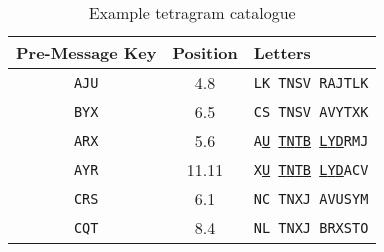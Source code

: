 \begin{table}[h!]
	\centering
	\begin{tabular}{|c|c|l|}
		\hline
		\textbf{Pre-Message Key} & \textbf{Position} & \textbf{Letters}                                                                                                                                                                                                                                        \\
		\hline
		\texttt{AJU}             & 4.8               & \texttt{LK TNSV RAJTLK}                                                                                                                                                                                                                                 \\
		\texttt{BYX}             & 6.5               & \texttt{CS TNSV AVYTXK}                                                                                                                                                                                                                                 \\
		\texttt{ARX}             & 5.6               & \texttt{A}{\uline{\texttt{U}}}\texttt{ }{\uline{\texttt{T}}}\texttt{}{\uline{\texttt{N}}}\texttt{}{\uline{\texttt{T}}}\texttt{}{\uline{\texttt{B}}}\texttt{ }{\uline{\texttt{L}}}\texttt{}{\uline{\texttt{Y}}}\texttt{}{\uline{\texttt{D}}}\texttt{RMJ} \\
		\texttt{AYR}             & 11.11             & \texttt{X}{\uline{\texttt{U}}}\texttt{ }{\uline{\texttt{T}}}\texttt{}{\uline{\texttt{N}}}\texttt{}{\uline{\texttt{T}}}\texttt{}{\uline{\texttt{B}}}\texttt{ }{\uline{\texttt{L}}}\texttt{}{\uline{\texttt{Y}}}\texttt{}{\uline{\texttt{D}}}\texttt{ACV} \\
		\texttt{CRS}             & 6.1               & \texttt{NC TNXJ AVUSYM}                                                                                                                                                                                                                                 \\
		\texttt{CQT}             & 8.4               & \texttt{}{\texttt{N}}\texttt{L TNXJ BRXSTO}                                                                                                                                                                                                             \\
		\hline
	\end{tabular}
	\caption{Example tetragram catalogue}
\end{table}

